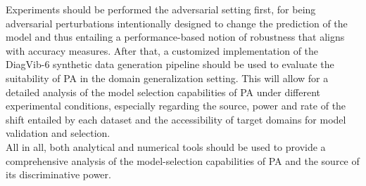 Experiments should be performed the adversarial setting first, for being adversarial perturbations
intentionally designed to change the prediction of the model and thus entailing a performance-based notion of
robustness that aligns with accuracy measures. After that, a customized implementation of 
the DiagVib-6 
\cite{euligDiagViB6DiagnosticBenchmark2021} 
synthetic data generation pipeline should be used to evaluate the suitability of PA in the domain
generalization setting. This will allow for a detailed analysis of the model selection capabilities of PA 
under different experimental conditions, especially regarding the source, power and rate of the shift 
entailed by each dataset and the accessibility of target domains for model validation and selection.\\


All in all, both analytical and numerical tools should be used to provide a comprehensive analysis
of the model-selection capabilities of PA and the source of its discriminative power. \\




